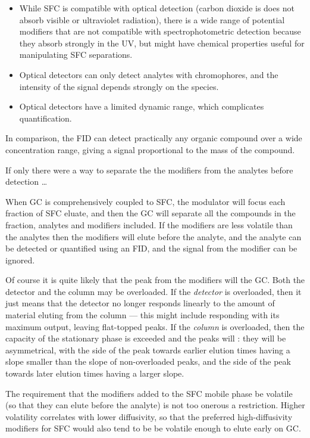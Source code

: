 \begin{itemize}

\item While SFC is compatible with optical detection (carbon dioxide is does not
absorb visible or ultraviolet radiation), there is a wide range of potential
modifiers that are not compatible with spectrophotometric detection because they
absorb strongly in the UV, but might have chemical properties useful for
manipulating SFC separations.

\item Optical detectors can only detect analytes with chromophores, and the
intensity of the signal depends strongly on the species.

\item Optical detectors have a limited dynamic range, which complicates quantification. 

\end{itemize}

In comparison, the FID can detect practically any organic compound over a wide
concentration range, giving a signal proportional to the mass of the compound.

If only there were a way to separate the the modifiers from the analytes before
detection \ldots

When GC is comprehensively coupled to SFC, the modulator will focus each
fraction of SFC eluate, and then the GC will separate all the compounds in the
fraction, analytes and modifiers included. If the modifiers are less volatile
than the analytes then the modifiers will elute before the analyte, and the
analyte can be detected or quantified using an FID, and the signal from the
modifier can be ignored.

Of course it is quite likely that the peak from the modifiers will
 the GC. Both the detector and the column may be overloaded.
If the \emph{detector} is overloaded, then it just means that the detector no
longer responds linearly to the amount of material eluting from the column ---
this might include responding with its maximum output, leaving flat-topped
peaks. If the \emph{column} is overloaded, then the capacity of the stationary
phase is exceeded and the peaks will : they will be asymmetrical,
with the side of the peak towards earlier elution times having a slope smaller
than the slope of non-overloaded peaks, and the side of the peak towards later
elution times having a larger slope.

The requirement that the modifiers added to the SFC mobile phase be volatile (so
that they can elute before the analyte) is not too onerous a restriction. Higher
volatility correlates with lower diffusivity, so that the preferred
high-diffusivity modifiers for SFC  would also tend to be be volatile enough to
elute early on GC. 

